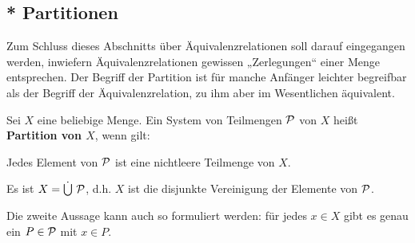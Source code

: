 \subsection*{* Partitionen}


Zum Schluss dieses Abschnitts über Äquivalenzrelationen soll darauf eingegangen werden, inwiefern Äquivalenzrelationen gewissen „Zerlegungen“ einer Menge entsprechen. Der Begriff der Partition ist für manche Anfänger leichter begreifbar als der Begriff der Äquivalenzrelation, zu ihm aber im Wesentlichen äquivalent.


\begin{defin}[Partition] 
    Sei $X$ eine beliebige Menge. Ein System von Teilmengen $\mathcal P$ von $X$ heißt \textbf{Partition von $X$}, wenn gilt:
    \begin{labeling}[(P1), labelindent=1.5em]
        \item Jedes Element von $\mathcal P$ ist eine nichtleere Teilmenge von $X$.
        \item Es ist $X=\dot{\bigcup}\ \mathcal P$, d.h. $X$ ist die disjunkte Vereinigung der Elemente von $\mathcal P$.
    \end{labeling}
    Die zweite Aussage kann auch so formuliert werden: für jedes $x\in X$ gibt es genau ein $P\in \mathcal P$ mit $x\in P$.
\end{defin}


